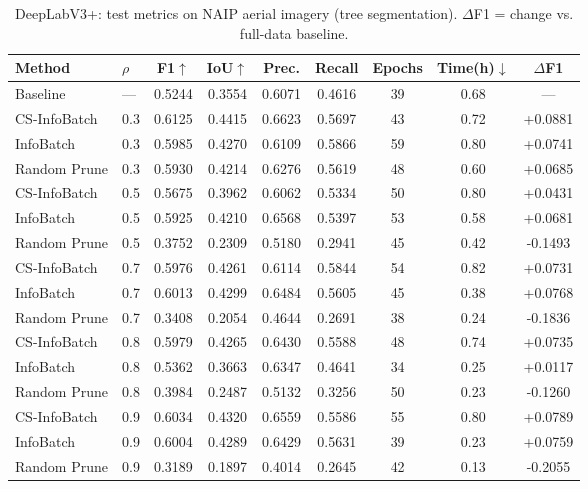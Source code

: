 \begin{table}[ht]
\centering
\small
\caption{DeepLabV3+: test metrics on NAIP aerial imagery (tree segmentation). $\Delta$F1 = change vs. full-data baseline.}
\label{tab:main_results_deeplabv3plus}
\begin{tabular}{llccccccc}
\toprule
Method & $\rho$ & F1$\uparrow$ & IoU$\uparrow$ & Prec. & Recall & Epochs & Time(h)$\downarrow$ & $\Delta$F1 \\
\midrule
Baseline & --- & 0.5244 & 0.3554 & 0.6071 & 0.4616 & 39 & 0.68 & --- \\
\midrule
CS-InfoBatch & 0.3 & 0.6125 & 0.4415 & 0.6623 & 0.5697 & 43 & 0.72 & +0.0881 \\
InfoBatch & 0.3 & 0.5985 & 0.4270 & 0.6109 & 0.5866 & 59 & 0.80 & +0.0741 \\
Random Prune & 0.3 & 0.5930 & 0.4214 & 0.6276 & 0.5619 & 48 & 0.60 & +0.0685 \\
\midrule
CS-InfoBatch & 0.5 & 0.5675 & 0.3962 & 0.6062 & 0.5334 & 50 & 0.80 & +0.0431 \\
InfoBatch & 0.5 & 0.5925 & 0.4210 & 0.6568 & 0.5397 & 53 & 0.58 & +0.0681 \\
Random Prune & 0.5 & 0.3752 & 0.2309 & 0.5180 & 0.2941 & 45 & 0.42 & -0.1493 \\
\midrule
CS-InfoBatch & 0.7 & 0.5976 & 0.4261 & 0.6114 & 0.5844 & 54 & 0.82 & +0.0731 \\
InfoBatch & 0.7 & 0.6013 & 0.4299 & 0.6484 & 0.5605 & 45 & 0.38 & +0.0768 \\
Random Prune & 0.7 & 0.3408 & 0.2054 & 0.4644 & 0.2691 & 38 & 0.24 & -0.1836 \\
\midrule
CS-InfoBatch & 0.8 & 0.5979 & 0.4265 & 0.6430 & 0.5588 & 48 & 0.74 & +0.0735 \\
InfoBatch & 0.8 & 0.5362 & 0.3663 & 0.6347 & 0.4641 & 34 & 0.25 & +0.0117 \\
Random Prune & 0.8 & 0.3984 & 0.2487 & 0.5132 & 0.3256 & 50 & 0.23 & -0.1260 \\
\midrule
CS-InfoBatch & 0.9 & 0.6034 & 0.4320 & 0.6559 & 0.5586 & 55 & 0.80 & +0.0789 \\
InfoBatch & 0.9 & 0.6004 & 0.4289 & 0.6429 & 0.5631 & 39 & 0.23 & +0.0759 \\
Random Prune & 0.9 & 0.3189 & 0.1897 & 0.4014 & 0.2645 & 42 & 0.13 & -0.2055 \\
\bottomrule
\end{tabular}
\end{table}